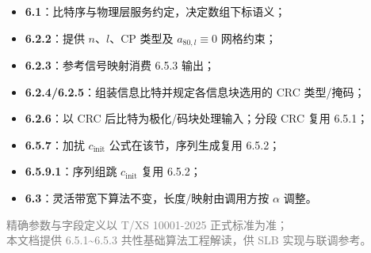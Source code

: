 \documentclass[11pt,a4paper]{ctexart}
\begin{document}
\begin{itemize}[nosep]
  \item \textbf{6.1}：比特序与物理层服务约定，决定数组下标语义；
  \item \textbf{6.2.2}：提供 $n$、$l$、CP 类型及 $a_{80,l}{\equiv}0$ 网格约束；
  \item \textbf{6.2.3}：参考信号映射消费 6.5.3 输出；
  \item \textbf{6.2.4/6.2.5}：组装信息比特并规定各信息块选用的 CRC 类型/掩码；
  \item \textbf{6.2.6}：以 CRC 后比特为极化/码块处理输入；分段 CRC 复用 6.5.1；
  \item \textbf{6.5.7}：加扰 $c_{\mathrm{init}}$ 公式在该节，序列生成复用 6.5.2；
  \item \textbf{6.5.9.1}：序列组跳 $c_{\mathrm{init}}$ 复用 6.5.2；
  \item \textbf{6.3}：灵活带宽下算法不变，长度/映射由调用方按 $\alpha$ 调整。
\end{itemize}

\vfill
\begin{center}
\small\textcolor{gray}{精确参数与字段定义以 T/XS 10001-2025 正式标准为准；\\
本文档提供 6.5.1\textasciitilde 6.5.3 共性基础算法工程解读，供 SLB 实现与联调参考。}
\end{center}
\end{document}
